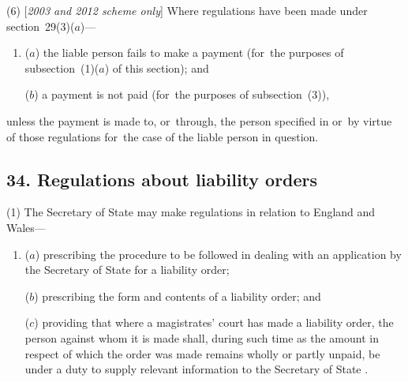 \documentclass[12pt,a4paper]{article}
\begin{document}
(6) [\emph{2003 and 2012 scheme only}] Where regulations have been made under section~29(3)($a$)—
\begin{enumerate}\item[]
($a$) the liable person fails to make a payment (for~the purposes of subsection~(1)($a$)  of this section); and

($b$) a payment is not paid (for~the purposes of subsection~(3)),
\end{enumerate}
unless the payment is made to, or~through, the person specified in or~by virtue of those regulations for~the case of the liable person in question.


\subsection{34. Regulations about liability orders}

(1) The Secretary of State may make regulations in relation to England and Wales—
\begin{enumerate}\item[]
($a$) prescribing the procedure to be followed in dealing with an application by the 
Secretary of State  %
for a liability order;

($b$) prescribing the form and contents of a liability order; and

($c$) providing that where a magistrates' court has made a liability order, the person against whom it is made shall, during such time as the amount in respect of which the order was made remains wholly or partly unpaid, be under a duty to supply relevant information to the 
Secretary of State%
.
\end{enumerate}
\end{document}
